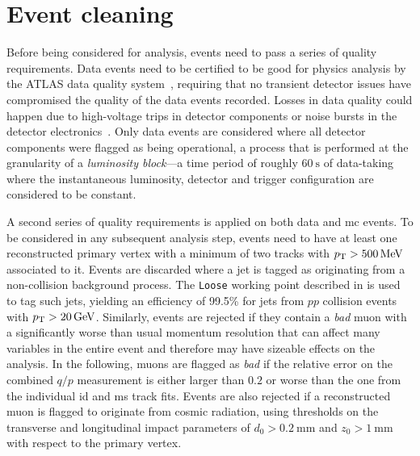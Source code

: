 \section{Event cleaning}

Before being considered for analysis, events need to pass a series of quality requirements.
Data events need to be certified to be good for physics analysis by the ATLAS data quality system~\cite{DAPR-2018-01}, requiring that no transient detector issues have compromised the quality of the data events recorded.
Losses in data quality could happen due to \eg high-voltage trips in detector components or noise bursts in the detector electronics~\cite{DAPR-2018-01}.
Only data events are considered where all detector components were flagged as being operational, a process that is performed at the granularity of a \textit{luminosity block}---a time period of roughly $\SI{60}{\second}$ of data-taking where the instantaneous luminosity, detector and trigger configuration are considered to be constant. 

A second series of quality requirements is applied on both data and \gls{mc} events.
To be considered in any subsequent analysis step, events need to have at least one reconstructed primary vertex with a minimum of two tracks with $\pt > \SI{500}{\MeV}$ associated to it.
Events are discarded where a jet is tagged as originating from a non-collision background process. The \texttt{Loose} working point described in \cite{ATLAS-CONF-2015-029} is used to tag such jets, yielding an efficiency of 99.5\% for jets from $pp$ collision events with $\pt>\SI{20}{\GeV}$.
Similarly, events are rejected if they contain a \textit{bad} muon with a significantly worse than usual momentum resolution that can affect many variables in the entire event and therefore may have sizeable effects on the analysis.
In the following, muons are flagged as \textit{bad} if the relative error on the combined $q/p$ measurement is either larger than $0.2$ or worse than the one from the individual \gls{id} and \gls{ms} track fits.
Events are also rejected if a reconstructed muon is flagged to originate from cosmic radiation, using thresholds on the transverse and longitudinal impact parameters of $d_0 > \SI{0.2}{\milli\meter}$ and $z_0 > \SI{1}{\milli\meter}$ with respect to the primary vertex.



